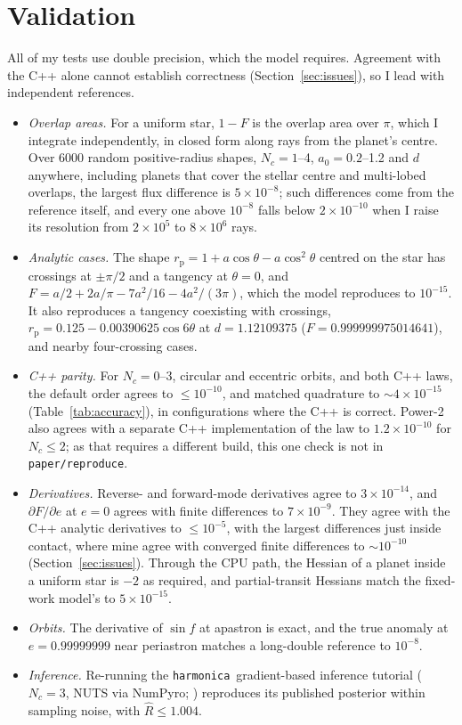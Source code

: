 \documentclass[twocolumn]{aastex701}
\newcommand{\harmonica}{\texttt{harmonica}}
\begin{document}
\section{Validation} \label{sec:validation}

All of my tests use double precision, which the model requires.
Agreement with the C++ alone cannot establish correctness
(Section~\ref{sec:issues}), so I lead with independent references.
\begin{itemize}
\item \textit{Overlap areas.} For a uniform star, $1-F$ is the overlap
area over $\pi$, which I integrate independently, in closed form along
rays from the planet's centre. Over 6000 random positive-radius shapes,
$N_c=1$--4, $a_0 = 0.2$--1.2 and $d$ anywhere, including planets that
cover the stellar centre and multi-lobed overlaps, the largest
flux difference is $5\times10^{-8}$; such differences come from the
reference itself, and every one above $10^{-8}$ falls below
$2\times10^{-10}$ when I raise its resolution from $2\times10^5$ to
$8\times10^6$ rays.
\item \textit{Analytic cases.} The shape $r_\mathrm{p} = 1 + a\cos\theta
- a\cos^2\theta$ centred on the star has crossings at $\pm\pi/2$ and a
tangency at $\theta=0$, and
$F = a/2 + 2a/\pi - 7a^2/16 - 4a^2/(3\pi)$, which the model reproduces
to $10^{-15}$. It also reproduces a tangency coexisting with crossings,
$r_\mathrm{p} = 0.125 - 0.00390625\cos 6\theta$ at $d=1.12109375$
($F = 0.999999975014641$), and nearby four-crossing cases.
\item \textit{C++ parity.} For $N_c = 0$--3, circular and eccentric
orbits, and both C++ laws, the default order agrees to
$\leq 10^{-10}$, and matched quadrature to ${\sim}4\times10^{-15}$
(Table~\ref{tab:accuracy}), in configurations where the C++ is correct.
Power-2 also agrees with a separate C++ implementation of the law to
$1.2\times10^{-10}$ for $N_c\leq2$; as that requires a different build,
this one check is not in \texttt{paper/reproduce}.
\item \textit{Derivatives.} Reverse- and forward-mode derivatives agree
to $3\times10^{-14}$, and $\partial F/\partial e$ at $e=0$ agrees with
finite differences to $7\times10^{-9}$. They agree with the C++ analytic derivatives to
$\leq10^{-5}$, with the largest differences just inside contact, where
mine agree with converged finite differences to ${\sim}10^{-10}$
(Section~\ref{sec:issues}). Through the CPU path, the Hessian of a planet
inside a uniform star is $-2$ as required, and partial-transit Hessians
match the fixed-work model's to $5\times10^{-15}$.
\item \textit{Orbits.} The derivative of $\sin f$ at apastron is exact,
and the true anomaly at $e = 0.99999999$ near periastron matches a
long-double reference to $10^{-8}$.
\item \textit{Inference.} Re-running the \harmonica\ gradient-based
inference tutorial ($N_c=3$, NUTS via NumPyro; \citealt{phan2019})
reproduces its published posterior within sampling noise, with
$\hat{R}\leq1.004$.
\end{itemize}
\end{document}
